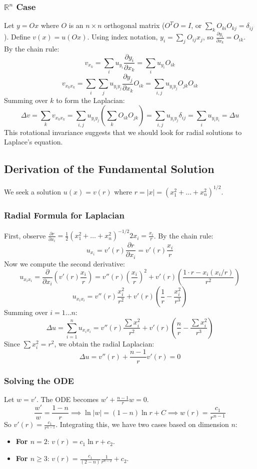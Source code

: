 \documentclass[11pt]{article}
\theoremstyle{plain}
\theoremstyle{definition}
\theoremstyle{remark}
\begin{document}
\subsubsection{$\mathbb{R}^n$ Case}
Let $y = Ox$ where $O$ is an $n \times n$ orthogonal matrix ($O^T O = I$, or $\sum_k O_{ki} O_{kj} = \delta_{ij}$). Define $v(x) = u(Ox)$.
Using index notation, $y_i = \sum_j O_{ij} x_j$, so $\frac{\partial y_i}{\partial x_k} = O_{ik}$.
By the chain rule:
$$ v_{x_k} = \sum_i u_{y_i} \frac{\partial y_i}{\partial x_k} = \sum_i u_{y_i} O_{ik} $$
$$ v_{x_k x_k} = \sum_i \sum_j u_{y_i y_j} \frac{\partial y_j}{\partial x_k} O_{ik} = \sum_{i,j} u_{y_i y_j} O_{jk} O_{ik} $$
Summing over $k$ to form the Laplacian:
$$ \Delta v = \sum_k v_{x_k x_k} = \sum_{i,j} u_{y_i y_j} \left( \sum_k O_{ik} O_{jk} \right) = \sum_{i,j} u_{y_i y_j} \delta_{ij} = \sum_i u_{y_i y_i} = \Delta u $$
This rotational invariance suggests that we should look for radial solutions to Laplace's equation.

\subsection{Derivation of the Fundamental Solution}
We seek a solution $u(x) = v(r)$ where $r = |x| = (x_1^2 + \dots + x_n^2)^{1/2}$.

\subsubsection{Radial Formula for Laplacian}\label{sssec:radlap}
First, observe $\frac{\partial r}{\partial x_i} = \frac{1}{2} (x_1^2 + \dots + x_n^2)^{-1/2} 2x_i = \frac{x_i}{r}$.
By the chain rule:
$$ u_{x_i} = v'(r) \frac{\partial r}{\partial x_i} = v'(r) \frac{x_i}{r} $$
Now we compute the second derivative:
$$ u_{x_i x_i} = \frac{\partial}{\partial x_i} \left( v'(r) \frac{x_i}{r} \right) = v''(r) \left( \frac{x_i}{r} \right)^2 + v'(r) \left( \frac{1 \cdot r - x_i (x_i/r)}{r^2} \right) $$
$$ u_{x_i x_i} = v''(r) \frac{x_i^2}{r^2} + v'(r) \left( \frac{1}{r} - \frac{x_i^2}{r^3} \right) $$
Summing over $i=1 \dots n$:
$$ \Delta u = \sum_{i=1}^n u_{x_i x_i} = v''(r) \frac{\sum x_i^2}{r^2} + v'(r) \left( \frac{n}{r} - \frac{\sum x_i^2}{r^3} \right) $$
Since $\sum x_i^2 = r^2$, we obtain the radial Laplacian:
$$ \Delta u = v''(r) + \frac{n-1}{r} v'(r) = 0 $$

\subsubsection{Solving the ODE}
Let $w = v'$. The ODE becomes $w' + \frac{n-1}{r} w = 0$.
$$ \frac{w'}{w} = \frac{1-n}{r} \implies \ln|w| = (1-n)\ln r + C \implies w(r) = \frac{c_1}{r^{n-1}} $$
So $v'(r) = \frac{c_1}{r^{n-1}}$.
Integrating this, we have two cases based on dimension $n$:
\begin{itemize}
    \item \textbf{For $n=2$}: $v(r) = c_1 \ln r + c_2$.
    \item \textbf{For $n \geq 3$}: $v(r) = \frac{c_1}{(2-n)} \frac{1}{r^{n-2}} + c_2$.
\end{itemize}
\end{document}
